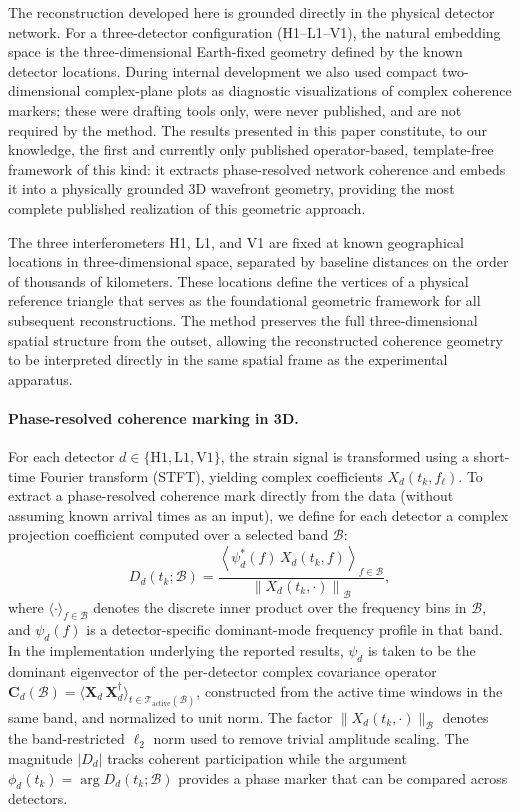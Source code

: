 \documentclass[11pt,a4paper]{article}
\begin{document}
The reconstruction developed here is grounded directly in the physical detector network.
For a three-detector configuration (H1--L1--V1), the natural embedding space is the
three-dimensional Earth-fixed geometry defined by the known detector locations.
During internal development we also used compact two-dimensional complex-plane plots as
diagnostic visualizations of complex coherence markers; these were drafting tools only,
were never published, and are not required by the method.
The results presented in this paper constitute, to our knowledge, the first and currently
only published operator-based, template-free framework of this kind: it extracts
phase-resolved network coherence and embeds it into a physically grounded 3D wavefront
geometry, providing the most complete published realization of this geometric approach.

The three interferometers H1, L1, and V1 are fixed at known geographical locations
in three-dimensional space, separated by baseline distances on the order of thousands
of kilometers.
These locations define the vertices of a physical reference triangle that serves as
the foundational geometric framework for all subsequent reconstructions.
The method preserves the full three-dimensional spatial structure from the outset,
allowing the reconstructed coherence geometry to be interpreted directly in the same
spatial frame as the experimental apparatus.

\paragraph{Phase-resolved coherence marking in 3D.}
For each detector $d \in \{\mathrm{H1}, \mathrm{L1}, \mathrm{V1}\}$, the strain signal is transformed using a
short-time Fourier transform (STFT), yielding complex coefficients $X_d(t_k,f_\ell)$.
To extract a phase-resolved coherence mark directly from the data (without assuming
known arrival times as an input), we define for each detector a complex projection
coefficient computed over a selected band $\mathcal{B}$:
\begin{equation}
D_d(t_k;\mathcal{B})
=
\frac{\left\langle \psi_d^*(f)\, X_d(t_k,f) \right\rangle_{f\in\mathcal{B}}}{\left\| X_d(t_k,\cdot) \right\|_{\mathcal{B}}},
\end{equation}
where $\langle\cdot\rangle_{f\in\mathcal{B}}$ denotes the discrete inner product over the
frequency bins in $\mathcal{B}$, and $\psi_d(f)$ is a detector-specific dominant-mode
frequency profile in that band.
In the implementation underlying the reported results, $\psi_d$ is taken to be the
dominant eigenvector of the per-detector complex covariance operator
$\mathbf{C}_d(\mathcal{B})=\langle \mathbf{X}_d\,\mathbf{X}_d^{\dagger}\rangle_{t\in\mathcal{T}_{\mathrm{active}}(\mathcal{B})}$,
constructed from the active time windows in the same band, and normalized to unit norm.
The factor $\|X_d(t_k,\cdot)\|_{\mathcal{B}}$ denotes
the band-restricted $\ell_2$ norm used to remove trivial amplitude scaling.
The magnitude $|D_d|$ tracks coherent participation while the argument
$\phi_d(t_k)=\arg D_d(t_k;\mathcal{B})$ provides a phase marker that can be compared
across detectors.
\end{document}

